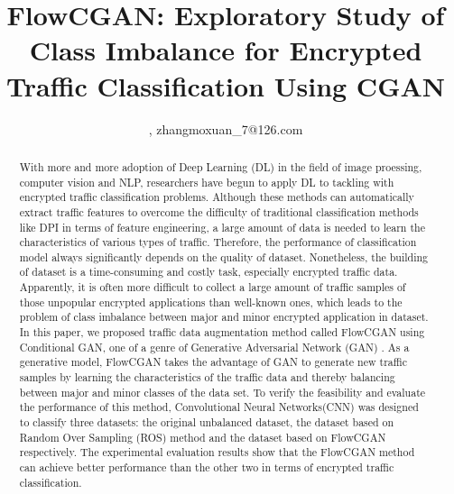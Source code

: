 \documentclass[conference]{IEEEtran}
\begin{document}
	
	\title{FlowCGAN: Exploratory Study of Class Imbalance for Encrypted Traffic Classification Using CGAN}
	
	
	
	
\author{
		,
		zhangmoxuan\_7@126.com}	
\maketitle
	
\begin{abstract}
With more and more adoption of Deep Learning (DL) in the field of image proessing, computer vision and NLP, researchers have begun to apply DL to tackling with  encrypted traffic classification problems. Although these methods can automatically extract traffic features to overcome the difficulty of traditional classification methods like DPI in terms of feature engineering, a large amount of data is needed to learn the characteristics of various types of traffic. Therefore, the performance of classification model always significantly depends on the quality of dataset. Nonetheless, the building of dataset is a time-consuming and costly task, especially encrypted traffic data. Apparently, it is often more difficult to collect a large amount of traffic samples of those unpopular encrypted applications than well-known ones, which leads to the problem of class imbalance between major and minor encrypted application in dataset. In this paper, we proposed traffic data augmentation method called FlowCGAN using Conditional GAN, one of a genre of Generative Adversarial Network (GAN) . As a generative model, FlowCGAN takes the advantage of GAN to generate new traffic samples by learning the characteristics of the traffic data and thereby balancing between major and minor classes of the data set. To verify the feasibility and evaluate the performance of this method, Convolutional Neural Networks(CNN) was designed to classify three datasets: the original unbalanced dataset, the dataset based on Random Over Sampling (ROS) method and the dataset based on FlowCGAN respectively. The experimental evaluation results show that the FlowCGAN method can achieve better performance than the other two in terms of encrypted traffic classification.
\end{abstract}
\end{document}
